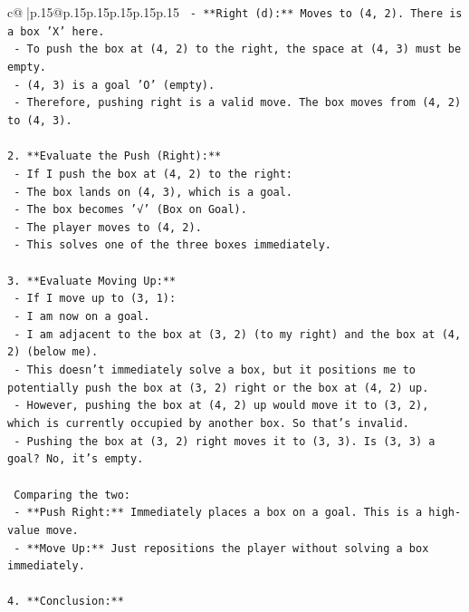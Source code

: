 \documentclass{article}
\begin{document}
{\begin{supertabular}{c@{$\;$}|p{.15\linewidth}@{}p{.15\linewidth}p{.15\linewidth}p{.15\linewidth}p{.15\linewidth}p{.15\linewidth}}
{{{\texttt{    {-} **Right (d):** Moves to (4, 2). There is a box 'X' here.} \\
\texttt{        {-} To push the box at (4, 2) to the right, the space at (4, 3) must be empty.} \\
\texttt{        {-} (4, 3) is a goal 'O' (empty).} \\
\texttt{        {-} Therefore, pushing right is a valid move. The box moves from (4, 2) to (4, 3).} \\
\\ 
\texttt{2.  **Evaluate the Push (Right):**} \\
\texttt{    {-} If I push the box at (4, 2) to the right:} \\
\texttt{        {-} The box lands on (4, 3), which is a goal.} \\
\texttt{        {-} The box becomes '√' (Box on Goal).} \\
\texttt{        {-} The player moves to (4, 2).} \\
\texttt{    {-} This solves one of the three boxes immediately.} \\
\\ 
\texttt{3.  **Evaluate Moving Up:**} \\
\texttt{    {-} If I move up to (3, 1):} \\
\texttt{        {-} I am now on a goal.} \\
\texttt{        {-} I am adjacent to the box at (3, 2) (to my right) and the box at (4, 2) (below me).} \\
\texttt{        {-} This doesn't immediately solve a box, but it positions me to potentially push the box at (3, 2) right or the box at (4, 2) up.} \\
\texttt{        {-} However, pushing the box at (4, 2) up would move it to (3, 2), which is currently occupied by another box. So that's invalid.} \\
\texttt{        {-} Pushing the box at (3, 2) right moves it to (3, 3). Is (3, 3) a goal? No, it's empty.} \\
\\ 
\texttt{    Comparing the two:} \\
\texttt{    {-} **Push Right:** Immediately places a box on a goal. This is a high{-}value move.} \\
\texttt{    {-} **Move Up:** Just repositions the player without solving a box immediately.} \\
\\ 
\texttt{4.  **Conclusion:**} \\
}}}
\end{supertabular}}
\end{document}
